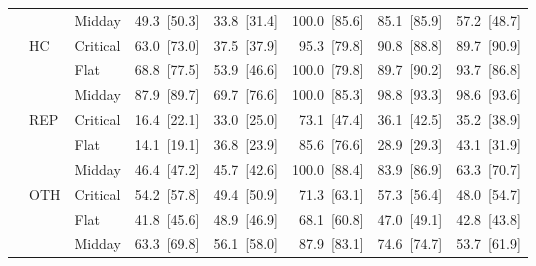 \begin{tabular}{l l l r r r r r}
 &  & Midday & 49.3~{\color{seasoncol}\scriptsize[50.3]} & 33.8~{\color{seasoncol}\scriptsize[31.4]} & 100.0~{\color{seasoncol}\scriptsize[85.6]} & 85.1~{\color{seasoncol}\scriptsize[85.9]} & 57.2~{\color{seasoncol}\scriptsize[48.7]} \\
 & HC & Critical & 63.0~{\color{seasoncol}\scriptsize[73.0]} & 37.5~{\color{seasoncol}\scriptsize[37.9]} & 95.3~{\color{seasoncol}\scriptsize[79.8]} & 90.8~{\color{seasoncol}\scriptsize[88.8]} & 89.7~{\color{seasoncol}\scriptsize[90.9]} \\
 &  & Flat & 68.8~{\color{seasoncol}\scriptsize[77.5]} & 53.9~{\color{seasoncol}\scriptsize[46.6]} & 100.0~{\color{seasoncol}\scriptsize[79.8]} & 89.7~{\color{seasoncol}\scriptsize[90.2]} & 93.7~{\color{seasoncol}\scriptsize[86.8]} \\
 &  & Midday & 87.9~{\color{seasoncol}\scriptsize[89.7]} & 69.7~{\color{seasoncol}\scriptsize[76.6]} & 100.0~{\color{seasoncol}\scriptsize[85.3]} & 98.8~{\color{seasoncol}\scriptsize[93.3]} & 98.6~{\color{seasoncol}\scriptsize[93.6]} \\
 & REP & Critical & 16.4~{\color{seasoncol}\scriptsize[22.1]} & 33.0~{\color{seasoncol}\scriptsize[25.0]} & 73.1~{\color{seasoncol}\scriptsize[47.4]} & 36.1~{\color{seasoncol}\scriptsize[42.5]} & 35.2~{\color{seasoncol}\scriptsize[38.9]} \\
 &  & Flat & 14.1~{\color{seasoncol}\scriptsize[19.1]} & 36.8~{\color{seasoncol}\scriptsize[23.9]} & 85.6~{\color{seasoncol}\scriptsize[76.6]} & 28.9~{\color{seasoncol}\scriptsize[29.3]} & 43.1~{\color{seasoncol}\scriptsize[31.9]} \\
 &  & Midday & 46.4~{\color{seasoncol}\scriptsize[47.2]} & 45.7~{\color{seasoncol}\scriptsize[42.6]} & 100.0~{\color{seasoncol}\scriptsize[88.4]} & 83.9~{\color{seasoncol}\scriptsize[86.9]} & 63.3~{\color{seasoncol}\scriptsize[70.7]} \\
 & OTH & Critical & 54.2~{\color{seasoncol}\scriptsize[57.8]} & 49.4~{\color{seasoncol}\scriptsize[50.9]} & 71.3~{\color{seasoncol}\scriptsize[63.1]} & 57.3~{\color{seasoncol}\scriptsize[56.4]} & 48.0~{\color{seasoncol}\scriptsize[54.7]} \\
 &  & Flat & 41.8~{\color{seasoncol}\scriptsize[45.6]} & 48.9~{\color{seasoncol}\scriptsize[46.9]} & 68.1~{\color{seasoncol}\scriptsize[60.8]} & 47.0~{\color{seasoncol}\scriptsize[49.1]} & 42.8~{\color{seasoncol}\scriptsize[43.8]} \\
 &  & Midday & 63.3~{\color{seasoncol}\scriptsize[69.8]} & 56.1~{\color{seasoncol}\scriptsize[58.0]} & 87.9~{\color{seasoncol}\scriptsize[83.1]} & 74.6~{\color{seasoncol}\scriptsize[74.7]} & 53.7~{\color{seasoncol}\scriptsize[61.9]} \\

\end{tabular}
